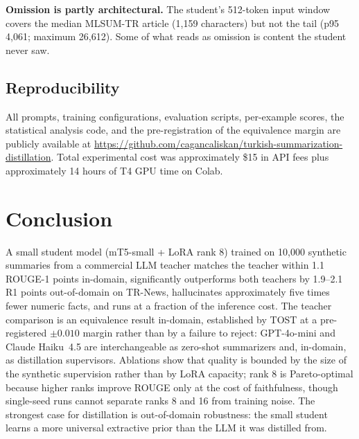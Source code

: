 \documentclass[conference]{IEEEtran}
\begin{document}
\textbf{Omission is partly architectural.} The student's 512-token input window covers the median MLSUM-TR article (1{,}159 characters) but not the tail (p95 4{,}061; maximum 26{,}612). Some of what reads as omission is content the student never saw.

\subsection{Reproducibility}
All prompts, training configurations, evaluation scripts, per-example scores, the statistical analysis code, and the pre-registration of the equivalence margin are publicly available at \url{https://github.com/cagancaliskan/turkish-summarization-distillation}. Total experimental cost was approximately \$15 in API fees plus approximately 14 hours of T4 GPU time on Colab.

\section{Conclusion}
A small student model (mT5-small + LoRA rank 8) trained on 10{,}000 synthetic summaries from a commercial LLM teacher matches the teacher within 1.1 ROUGE-1 points in-domain, significantly outperforms both teachers by 1.9--2.1 R1 points out-of-domain on TR-News, hallucinates approximately five times fewer numeric facts, and runs at a fraction of the inference cost. The teacher comparison is an equivalence result in-domain, established by TOST at a pre-registered $\pm0.010$ margin rather than by a failure to reject: GPT-4o-mini and Claude Haiku~4.5 are interchangeable as zero-shot summarizers and, in-domain, as distillation supervisors. Ablations show that quality is bounded by the size of the synthetic supervision rather than by LoRA capacity; rank 8 is Pareto-optimal because higher ranks improve ROUGE only at the cost of faithfulness, though single-seed runs cannot separate ranks 8 and 16 from training noise. The strongest case for distillation is out-of-domain robustness: the small student learns a more universal extractive prior than the LLM it was distilled from.
\end{document}
